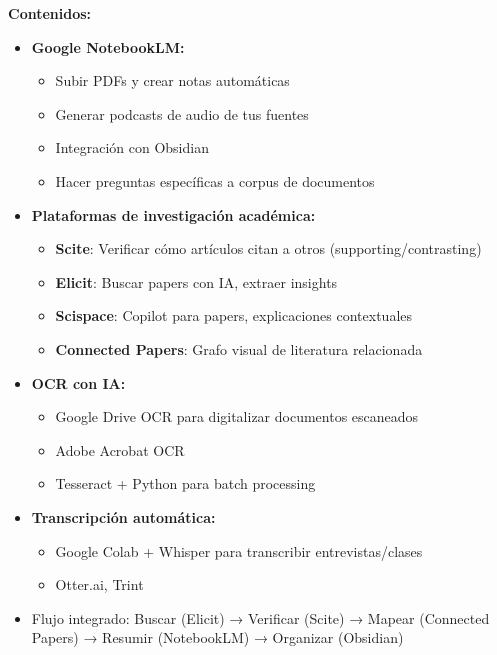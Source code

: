 \documentclass[12pt,a4paper]{yaac-luatex}
\begin{document}
\begin{tcolorbox}[
		enhanced,
		colback=white,
		colframe=curso1color,
		arc=3pt,
		boxrule=1.5pt,
		left=10pt,
		right=10pt,
		top=8pt,
		bottom=8pt,
		breakable
		]
		\textbf{Contenidos:}
		\begin{itemize}[leftmargin=*, itemsep=0.1cm]
			\item \textbf{Google NotebookLM:}
			\begin{itemize}
				\item Subir PDFs y crear notas automáticas
				\item Generar podcasts de audio de tus fuentes
				\item Integración con Obsidian
				\item Hacer preguntas específicas a corpus de documentos
			\end{itemize}
			\item \textbf{Plataformas de investigación académica:}
			\begin{itemize}
				\item \textbf{Scite}: Verificar cómo artículos citan a otros (supporting/contrasting)
				\item \textbf{Elicit}: Buscar papers con IA, extraer insights
				\item \textbf{Scispace}: Copilot para papers, explicaciones contextuales
				\item \textbf{Connected Papers}: Grafo visual de literatura relacionada
			\end{itemize}
			\item \textbf{OCR con IA:}
			\begin{itemize}
				\item Google Drive OCR para digitalizar documentos escaneados
				\item Adobe Acrobat OCR
				\item Tesseract + Python para batch processing
			\end{itemize}
			\item \textbf{Transcripción automática:}
			\begin{itemize}
				\item Google Colab + Whisper para transcribir entrevistas/clases
				\item Otter.ai, Trint
			\end{itemize}
			\item Flujo integrado: Buscar (Elicit) → Verificar (Scite) → Mapear (Connected Papers) → Resumir (NotebookLM) → Organizar (Obsidian)
		\end{itemize}
		

\end{tcolorbox}
\end{document}
